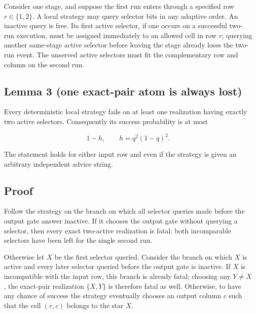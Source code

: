 \documentclass[11pt,a4paper]{article}
\begin{document}
Consider one stage, and suppose the first run enters through a specified row \(r\in\{1,2\}\).  A local strategy may query selector bits in any adaptive order.  An inactive query is free.  Its first active selector, if one occurs on a successful two-run execution, must be assigned immediately to an allowed cell in row \(r\); querying another same-stage active selector before leaving the stage already loses the two-run event.  The unserved active selectors must fit the complementary row and column on the second run.


\subsection*{Lemma 3 (one exact-pair atom is always lost)}

Every deterministic local strategy fails on at least one realization having exactly two active selectors.  Consequently its success probability is at most


\begin{equation}
                         1-h,\qquad
                         h=q^2(1-q)^2.
\tag{4.1}
\end{equation}

The statement holds for either input row and even if the strategy is given an arbitrary independent advice string.


\subsection*{Proof}

Follow the strategy on the branch on which all selector queries made before the output gate answer inactive.  If it chooses the output gate without querying a selector, then every exact two-active realization is fatal: both incomparable selectors have been left for the single second run.


Otherwise let \(X\) be the first selector queried.  Consider the branch on which \(X\) is active and every later selector queried before the output gate is inactive.  If \(X\) is incompatible with the input row, this branch is already fatal; choosing any \(Y\ne X\), the exact-pair realization \(\{X,Y\}\) is therefore fatal as well.  Otherwise, to have any chance of success the strategy eventually chooses an output column \(c\) such that the cell \((r,c)\) belongs to the star \(X\).
\end{document}

